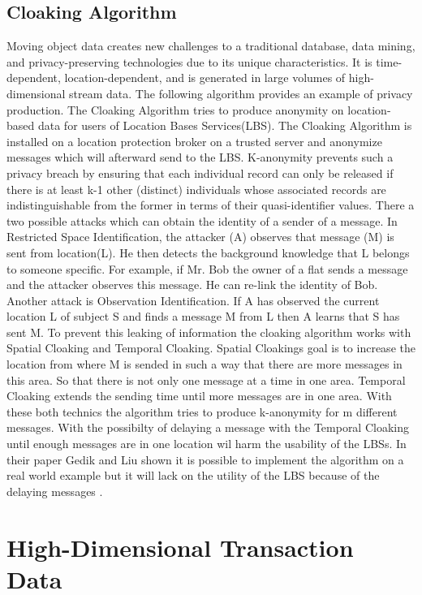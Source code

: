 \documentclass{llncs}
\begin{document}
\subsection{Cloaking Algorithm}
Moving object data creates new challenges to a traditional database, data mining, and privacy-preserving technologies due to its unique characteristics. It is time-dependent, location-dependent, and is generated in large volumes of high-dimensional stream data. The following algorithm provides an example of privacy production. The Cloaking Algorithm tries to produce anonymity on location-based data for users of Location Bases Services(LBS). The Cloaking Algorithm is installed on a location protection broker on a trusted server and anonymize messages which will afterward send to the LBS. K-anonymity prevents such a privacy breach by ensuring that each individual record can only be released if there is at least k-1 other (distinct) individuals whose associated records are indistinguishable from the former in terms of their quasi-identifier values. There a two possible attacks which can obtain  the identity of a sender of a message. In  Restricted Space Identification, the attacker (A) observes that message (M) is sent from location(L). He then detects the background knowledge that L belongs to someone specific. For example, if Mr. Bob the owner of a flat sends a message and the attacker observes this message. He can re-link the identity of Bob. Another attack is  Observation Identiﬁcation. If A has observed the current location L of subject S and ﬁnds a message M from L then A learns that S has sent M. To prevent this leaking of information the cloaking algorithm works with Spatial Cloaking and Temporal Cloaking. Spatial Cloakings goal is to increase the location from where M is sended in such a way that there are more messages in this area. So that there is not only one message at a time in one area. Temporal Cloaking extends the sending time until more messages are in one area. With these both technics the algorithm tries to produce k-anonymity for m different messages. With the possibilty of delaying a message with the Temporal Cloaking until enough messages are in one location wil harm the usability of the LBSs. In their paper Gedik and Liu shown it is possible to implement the algorithm on a real world example but it will lack on the utility of the LBS because of the delaying  messages \cite{gedik2004customizable}.



\section{High-Dimensional Transaction Data}
\end{document}
